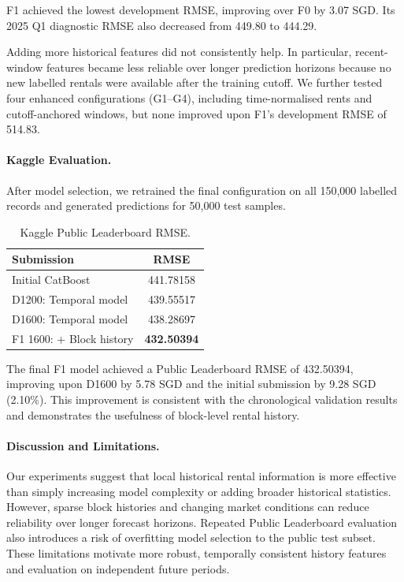 \documentclass[10pt,a4paper]{article}
\begin{document}
F1 achieved the lowest development RMSE, improving over F0 by 3.07 SGD. Its 2025 Q1 diagnostic RMSE also decreased from 449.80 to 444.29.

Adding more historical features did not consistently help. In particular, recent-window features became less reliable over longer prediction horizons because no new labelled rentals were available after the training cutoff. We further tested four enhanced configurations (G1--G4), including time-normalised rents and cutoff-anchored windows, but none improved upon F1's development RMSE of 514.83.

\paragraph{Kaggle Evaluation.}
After model selection, we retrained the final configuration on all 150,000 labelled records and generated predictions for 50,000 test samples.

\begin{table}[t]
\centering
\caption{Kaggle Public Leaderboard RMSE.}
\label{tab:f1_kaggle}
\small
\begin{tabular}{lc}
\hline
Submission & RMSE \\
\hline
Initial CatBoost & 441.78158 \\
D1200: Temporal model & 439.55517 \\
D1600: Temporal model & 438.28697 \\
F1 1600: + Block history & \textbf{432.50394} \\
\hline
\end{tabular}
\end{table}

The final F1 model achieved a Public Leaderboard RMSE of 432.50394, improving upon D1600 by 5.78 SGD and the initial submission by 9.28 SGD (2.10\%). This improvement is consistent with the chronological validation results and demonstrates the usefulness of block-level rental history.

\paragraph{Discussion and Limitations.}
Our experiments suggest that local historical rental information is more effective than simply increasing model complexity or adding broader historical statistics. However, sparse block histories and changing market conditions can reduce reliability over longer forecast horizons. Repeated Public Leaderboard evaluation also introduces a risk of overfitting model selection to the public test subset. These limitations motivate more robust, temporally consistent history features and evaluation on independent future periods.
\end{document}
